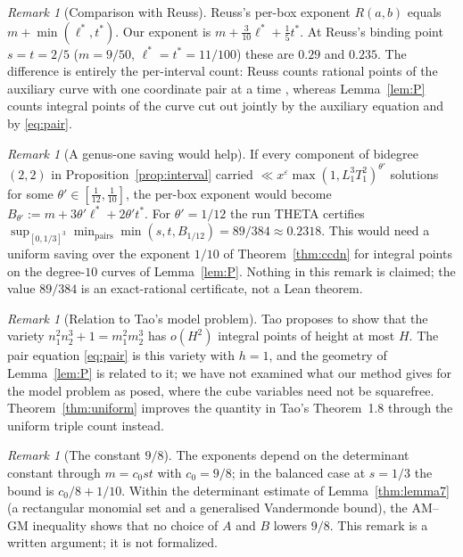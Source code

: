 \documentclass[11pt,reqno]{amsart}
\theoremstyle{definition}
\theoremstyle{remark}
\newtheorem{remark}[theorem]{Remark}
\numberwithin{equation}{section}
\newcommand{\lst}{\ell^{*}}
\newcommand{\tst}{t^{*}}
\begin{document}
\begin{remark}[Comparison with Reuss]\label{rem:compare}
Reuss's per-box exponent $R(a,b)$ equals $m+\min(\lst,\tst)$. Our exponent is
$m+\frac3{10}\lst+\frac15\tst$. At Reuss's binding point $s=t=2/5$
($m=9/50$, $\lst=\tst=11/100$) these are $0.29$ and $0.235$. The difference
is entirely the per-interval count: Reuss counts rational points of the
auxiliary curve with one coordinate pair at a time \cite[\S2.2, Lemma~8]{Reuss},
whereas Lemma~\ref{lem:P} counts integral points of the curve cut out jointly
by the auxiliary equation and by \eqref{eq:pair}.
\end{remark}

\begin{remark}[A genus-one saving would help]\label{rem:genus1}
If every component of bidegree $(2,2)$ in Proposition~\ref{prop:interval}
carried $\ll x^{\varepsilon}\max(1,L_1^3T_1^2)^{\theta'}$ solutions for some
$\theta'\in[\frac1{12},\frac1{10}]$, the per-box exponent would become
$B_{\theta'}:=m+3\theta'\lst+2\theta'\tst$. For $\theta'=1/12$ the run THETA
certifies $\sup_{[0,1/3]^3}\min_{\mathrm{pairs}}\min(s,t,B_{1/12})=89/384\approx0.2318$.
This would need a uniform saving over the exponent $1/10$ of
Theorem~\ref{thm:ccdn} for integral points on the degree-$10$ curves of
Lemma~\ref{lem:P}. Nothing in this remark is claimed; the value $89/384$ is an
exact-rational certificate, not a Lean theorem.
\end{remark}

\begin{remark}[Relation to Tao's model problem]\label{rem:tao}
Tao \cite[Remark~2.12]{Tao} proposes to show that the variety
$n_1^2n_2^3+1=m_1^2m_2^3$ \cite[(2.9)]{Tao} has $o(H^2)$ integral points of
height at most $H$. The pair equation \eqref{eq:pair} is this variety with
$h=1$, and the geometry of Lemma~\ref{lem:P} is related to it; we have not
examined what our method gives for the model problem as posed, where the cube
variables need not be squarefree. Theorem~\ref{thm:uniform} improves the
quantity in Tao's Theorem~1.8 through the uniform triple count instead.
\end{remark}

\begin{remark}[The constant $9/8$]\label{rem:98}
The exponents depend on the determinant constant through $m=c_0st$ with
$c_0=9/8$; in the balanced case at $s=1/3$ the bound is $c_0/8+1/10$. Within
the determinant estimate of Lemma~\ref{thm:lemma7} (a rectangular monomial set
and a generalised Vandermonde bound), the AM--GM inequality shows that no
choice of $A$ and $B$ lowers $9/8$.
This remark is a written argument; it is not formalized.
\end{remark}
\end{document}
